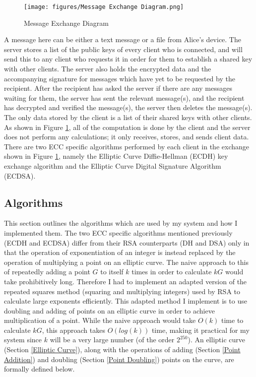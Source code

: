 \documentclass[12pt,a4paper]{article}
\begin{document}
\begin{figure}[htb]
    \centering
    \texttt{[image: figures/Message Exchange Diagram.png]}
    \caption{Message Exchange Diagram}
    \label{fig:messages}
\end{figure}

A message here can be either a text message or a file from Alice's device. 
The server stores a list of the public keys of every client who is connected, 
and will send this to any client who requests it in order for them to establish a shared key with other clients. 
The server also holds the encrypted data and the accompanying signature for messages which have yet to be requested by the recipient. 
After the recipient has asked the server if there are any messages waiting for them, the server has sent the relevant message(s), 
and the recipient has decrypted and verified the message(s), the server then deletes the message(s). 
The only data stored by the client is a list of their shared keys with other clients. 
As shown in Figure \ref{fig:messages}, all of the computation is done by the client and the server does not perform any calculations; 
it only receives, stores, and sends client data. 
There are two ECC specific algorithms performed by each client in the exchange shown in Figure \ref{fig:messages}, 
namely the Elliptic Curve Diffie-Hellman (ECDH) key exchange algorithm and the Elliptic Curve Digital Signature Algorithm (ECDSA). 

\subsection{Algorithms} \noindent \label{Algorithms}
This section outlines the algorithms which are used by my system and how I implemented them. 
The two ECC specific algorithms mentioned previously (ECDH and ECDSA) differ from their RSA counterparts (DH and DSA) only in that 
the operation of exponentiation of an integer is instead replaced by the operation of multiplying a point on an elliptic curve. 
The naive approach to this of repeatedly adding a point $G$ to itself $k$ times in order to calculate $kG$ would take prohibitively long. 
Therefore I had to implement an adapted version of the repeated squares method (squaring and multiplying integers) 
used by RSA to calculate large exponents efficiently. 
This adapted method I implement is to use doubling and adding of points on an elliptic curve in order to achieve multiplication of a point. 
While the naive approach would take $O(k)$ time to calculate $kG$, this approach takes $O(log(k))$ time, 
making it practical for my system since $k$ will be a very large number (of the order $2^{250}$). 
An elliptic curve (Section \ref{Elliptic Curve}), along with the operations of adding (Section \ref{Point Addition}) 
and doubling (Section \ref{Point Doubling}) points on the curve, are formally defined below. 
\end{document}

